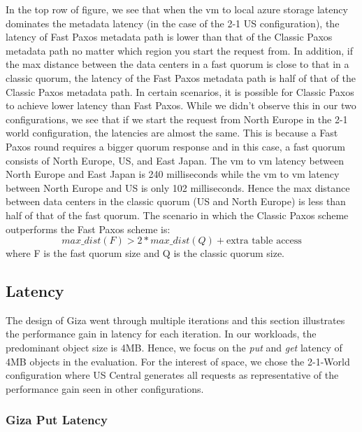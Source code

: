 In the top row of figure, we see that when the vm to local azure storage latency dominates the metadata latency (in the case of the 2-1 US configuration), the latency of Fast Paxos metadata path is lower than that of the Classic Paxos metadata path no matter which region you start the request from. In addition, if the max distance between the data centers in a fast quorum is close to that in a classic quorum, the latency of the Fast Paxos metadata path is half of that of the Classic Paxos metadata path. In certain scenarios, it is possible for Classic Paxos to achieve lower latency than Fast Paxos. While we didn’t observe this in our two configurations, we see that if we start the request from North Europe in the 2-1 world configuration, the latencies are almost the same. This is because a Fast Paxos round requires a bigger quorum response and in this case, a fast quorum consists of North Europe, US, and East Japan. The vm to vm latency between North Europe and East Japan is 240 milliseconds while the vm to vm latency between North Europe and US is only 102 milliseconds. Hence the max distance between data centers in the classic quorum (US and North Europe) is less than half of that of the fast quorum. The scenario in which the Classic Paxos scheme outperforms the Fast Paxos scheme is:
\[max\_dist(F) > 2 * max\_dist(Q) + \textrm{extra table access}
\]
where F is the fast quorum size and Q is the classic quorum size.


\subsection{\name Latency}
The design of Giza went through multiple iterations and this section illustrates the performance gain in latency for each iteration. In our workloads, the predominant object size is 4MB. Hence, we focus on the {\em put} and {\em get} latency of 4MB objects in the evaluation. For the interest of space, we chose the 2-1-World configuration where US Central generates all requests as representative of the performance gain seen in other configurations.

\subsubsection{Giza Put Latency}


